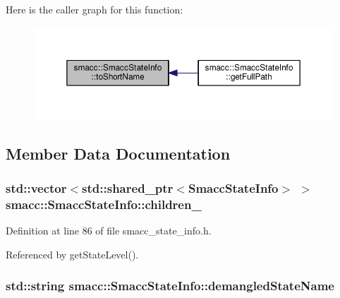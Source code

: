 Here is the caller graph for this function\+:
\nopagebreak
\begin{figure}[H]
\begin{center}
\leavevmode
\includegraphics[width=350pt]{classsmacc_1_1SmaccStateInfo_aa43c3733427618a141c3f6803913a88b_icgraph}
\end{center}
\end{figure}




\subsection{Member Data Documentation}
\subsubsection[{\texorpdfstring{children\+\_\+}{children_}}]{\setlength{\rightskip}{0pt plus 5cm}std\+::vector$<$std\+::shared\+\_\+ptr$<${\bf Smacc\+State\+Info}$>$ $>$ smacc\+::\+Smacc\+State\+Info\+::children\+\_\+}\hypertarget{classsmacc_1_1SmaccStateInfo_a7773f1d9e865a839b0bfed087bbb93ba}{}\label{classsmacc_1_1SmaccStateInfo_a7773f1d9e865a839b0bfed087bbb93ba}


Definition at line 86 of file smacc\+\_\+state\+\_\+info.\+h.



Referenced by get\+State\+Level().

\subsubsection[{\texorpdfstring{demangled\+State\+Name}{demangledStateName}}]{\setlength{\rightskip}{0pt plus 5cm}std\+::string smacc\+::\+Smacc\+State\+Info\+::demangled\+State\+Name}\hypertarget{classsmacc_1_1SmaccStateInfo_ad36e29f3984e40d36664567f9703239a}{}\label{classsmacc_1_1SmaccStateInfo_ad36e29f3984e40d36664567f9703239a}


